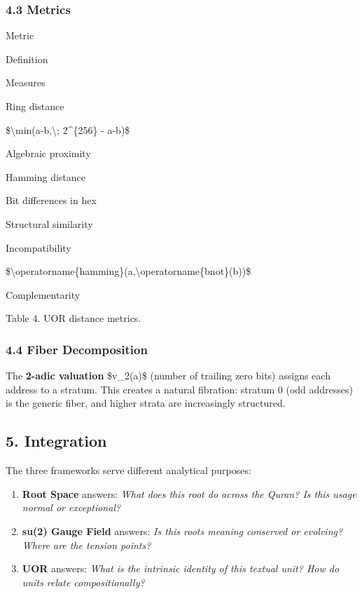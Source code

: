 \documentclass[12pt,a4paper]{article}
\providecommand{\tightlist}{\setlength{\itemsep}{0pt}\setlength{\parskip}{0pt}}
\begin{document}
\subsubsection{4.3 Metrics}\label{metrics}

Metric

Definition

Measures

Ring distance

\$\textbackslash min(\textbar a-b\textbar,\textbackslash; 2\^{}\{256\} -
\textbar a-b\textbar)\$

Algebraic proximity

Hamming distance

Bit differences in hex

Structural similarity

Incompatibility

\$\textbackslash operatorname\{hamming\}(a,\textbackslash operatorname\{bnot\}(b))\$

Complementarity

Table 4. UOR distance metrics.

\subsubsection{4.4 Fiber Decomposition}\label{fiber-decomposition}

The \textbf{2-adic valuation} \$v\_2(a)\$ (number of trailing zero bits)
assigns each address to a stratum. This creates a natural fibration:
stratum 0 (odd addresses) is the generic fiber, and higher strata are
increasingly structured.

\subsection{5. Integration}\label{integration}

The three frameworks serve different analytical purposes:

\begin{enumerate}
\tightlist
\item
  \textbf{Root Space} answers: \emph{What does this root do across the
  Quran? Is this usage normal or exceptional?}
\item
  \textbf{su(2) Gauge Field} answers: \emph{Is this
  root\textquotesingle s meaning conserved or evolving? Where are the
  tension points?}
\item
  \textbf{UOR} answers: \emph{What is the intrinsic identity of this
  textual unit? How do units relate compositionally?}
\end{enumerate}
\end{document}
